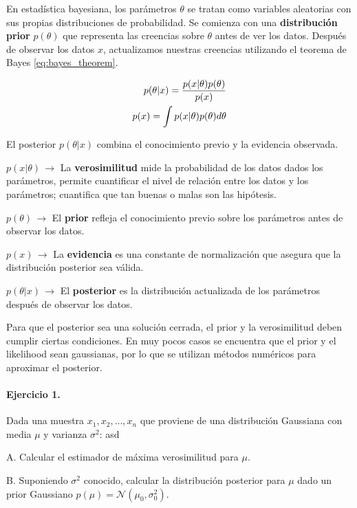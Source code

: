 En estadística bayesiana, los parámetros \(\theta\) se tratan como variables aleatorias con sus propias distribuciones de probabilidad. Se comienza con una \textbf{distribución prior} \(p(\theta)\) que representa las creencias sobre \(\theta\) antes de ver los datos. Después de observar los datos \(x\), actualizamos nuestras creencias utilizando el teorema de Bayes \eqref{eq:bayes_theorem}.

\begin{align}
    p(\theta|x) = \frac{p(x|\theta) p(\theta)}{p(x)} \label{eq:bayes_theorem} \\
    p(x) = \int p(x|\theta) p(\theta) d\theta \notag
\end{align}

El posterior \(p(\theta|x)\) combina el conocimiento previo y la evidencia observada.

\(p(x|\theta)\,\rightarrow\) La \textbf{verosimilitud} mide la probabilidad de los datos dados los parámetros, permite cuantificar el nivel de relación entre los datos y los parámetros; cuantifica que tan buenas o malas son las hipótesis.

\(p(\theta)\,\rightarrow\) El \textbf{prior} refleja el conocimiento previo sobre los parámetros antes de observar los datos.

\(p(x)\,\rightarrow\) La \textbf{evidencia} es una constante de normalización que asegura que la distribución posterior sea válida.

\(p(\theta|x)\,\rightarrow\)  El \textbf{posterior} es la distribución actualizada de los parámetros después de observar los datos.

Para que el posterior sea una solución cerrada, el prior y la verosimilitud deben cumplir ciertas condiciones. En muy pocos casos se encuentra que el prior y el likelihood sean gaussianas, por lo que se utilizan métodos numéricos para aproximar el posterior. 

\paragraph{Ejercicio 1.} Dada una muestra \(x_1, x_2, ..., x_n\) que proviene de una distribución Gaussiana con media \(\mu\) y varianza \(\sigma^2\): asd

A. Calcular el estimador de máxima verosimilitud para \(\mu\).

B. Suponiendo \(\sigma^2\) conocido, calcular la distribución posterior para \(\mu\) dado un prior Gaussiano \(p(\mu) = \mathcal{N}(\mu_0, \sigma_0^2)\).

